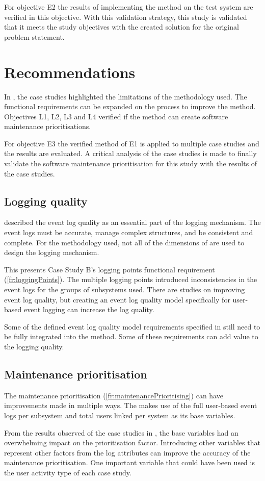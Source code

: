For objective E2 the results of implementing the method on the test system are verified in this objective. With this validation strategy, this study is validated that it meets the study objectives with the created solution for the original problem statement.

\section{Recommendations}
In , the case studies highlighted the limitations of the methodology used. The functional requirements can be expanded on the process to improve the method. Objectives L1, L2, L3 and L4 verified if the method can create software maintenance prioritisations.\par For objective E3 the verified method of E1 is applied to multiple case studies and the results are evaluated. A critical analysis of the case studies is made to finally validate the software maintenance prioritisation for this study with the results of the case studies. 

\subsection{Logging quality}
 described the event log quality as an essential part of the logging mechanism. The event logs must be accurate, manage complex structures, and be consistent and complete. For the methodology used, not all of the dimensions of  are used to design the logging mechanism.\par This presents Case Study B's logging points functional requirement (\ref{fr:loggingPoints}). The multiple logging points introduced inconsistencies in the event logs for the groups of subsystems used. There are studies on improving event log quality, but creating an event log quality model specifically for user-based event logging can increase the log quality. \par Some of the defined event log quality model requirements specified in  still need to be fully integrated into the method. Some of these requirements can add value to the logging quality.

\subsection{Maintenance prioritisation}
The maintenance prioritisation (\ref{fr:maintenancePrioritising}) can have improvements made in multiple ways. The  makes use of the full user-based event logs per subsystem and total users linked per system as its base variables.\par From the results observed of the case studies in , the base variables had an overwhelming impact on the prioritisation factor. Introducing other variables that represent other factors from the log attributes can improve the accuracy of the maintenance prioritisation. One important variable that could have been used is the user activity type of each case study.

